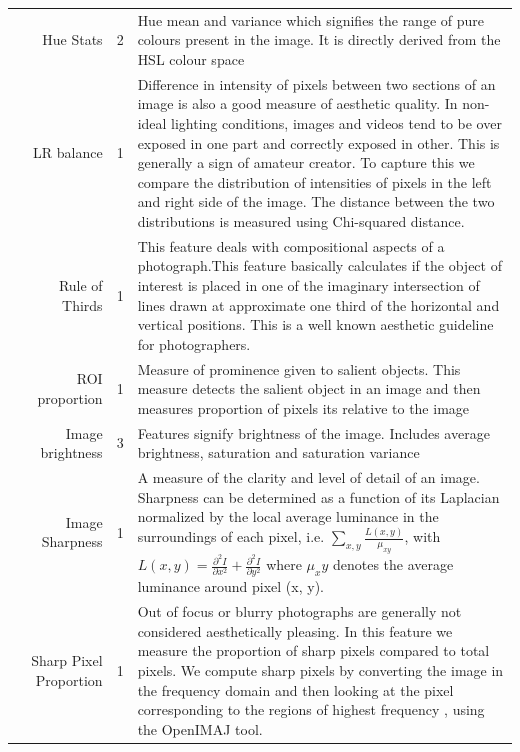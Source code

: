 \begin{table}[hp]
{\begin{tabular}{|c|r|c|p{17cm}|}
            & Hue Stats & 2 & Hue mean and variance which signifies the range of pure colours present in the image. It is directly derived from the HSL colour space \\ %
            & LR balance &1 & Difference in intensity of pixels between two sections of an image is also a good measure of aesthetic quality. In non-ideal lighting conditions, images and videos tend to be over exposed in one part and correctly exposed in other. This is generally a sign of amateur creator. To capture this we compare the distribution of intensities of pixels in the left and right side of the image. The distance between the two distributions is measured using Chi-squared distance.\\
            & Rule of Thirds & 1 & This feature deals with compositional aspects of a photograph.This feature basically calculates if the object of interest is placed in one of the imaginary intersection of lines drawn at approximate one third of the horizontal and vertical positions. This is a well known aesthetic guideline for photographers. \\
            & ROI proportion & 1 & Measure of prominence given to salient objects. This measure detects the salient object in an image and then measures proportion of pixels its relative to the image \\
            & Image brightness & 3 & Features signify brightness of the image. Includes average brightness, saturation  and saturation variance\\
            & Image Sharpness & 1 & A measure of the clarity and level of detail of an image. Sharpness can be determined as a function of its Laplacian normalized by the local average luminance in the surroundings of each pixel, i.e. $\sum_{x, y} \frac{L(x, y)}{\mu_{xy}}$, with $L(x, y) = \frac{\partial^2I}{\partial x^2}+\frac{\partial^2I}{\partial y^2}$ where $\mu_xy$ denotes the average luminance around pixel (x, y).\\
            & Sharp Pixel Proportion  & 1 & Out of focus or blurry photographs are generally not considered aesthetically pleasing. In this feature we measure the proportion of sharp pixels compared to total pixels. We compute sharp pixels by converting the image in the frequency domain and then looking at the pixel corresponding to the regions of highest frequency \cite{yeh2010personalized}, using the OpenIMAJ \cite{Hare:2011:OIJ:2072298.2072421} tool.\\
            

\end{tabular}}
\end{table}
